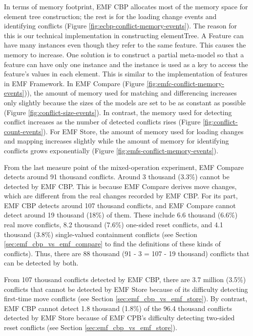 In terms of memory footprint, EMF CBP allocates most of the memory space for element tree construction; the rest is for the loading change events and identifying conflicts (Figure \ref{fig:ecbp-conflict-memory-events}). The reason for this is our technical implementation in constructing \textsf{elementTree}. A Feature can have many instances even though they refer to the same feature. This causes the memory to increase. One solution is to construct a partial meta-model so that a feature can have only one instance and the instance is used as a key to access the feature’s values in each element. This is similar to the implementation of features in EMF Framework. In EMF Compare (Figure \ref{fig:emfc-conflict-memory-events})), the amount of memory used for matching and differencing increases only slightly because the sizes of the models are set to be as constant as possible (Figure \ref{fig:conflict-size-events}). In contrast, the memory used for detecting conflict increases as the number of detected conflicts rises (Figure \ref{fig:conflict-count-events}). For EMF Store, the amount of memory used for loading changes and mapping increases slightly while the amount of memory for identifying conflicts grows exponentially (Figure \ref{fig:emfs-conflict-memory-events}).

From the last measure point of the mixed-operation experiment, EMF Compare detects around 91 thousand conflicts. Around 3 thousand (3.3\%) cannot be detected by EMF CBP. This is because EMF Compare derives move changes, which are different from the real changes recorded by EMF CBP. For its part, EMF CBP detects around 107 thousand conflicts, and EMF Compare cannot detect around 19 thousand (18\%) of them. These include 6.6 thousand (6.6\%) real move conflicts, 8.2 thousand (7.6\%) one-sided reset conflicts, and 4.1 thousand (3.8\%) single-valued containment conflicts (see Section \ref{sec:emf_cbp_vs_emf_compare} to find the definitions of these kinds of conflicts). Thus, there are 88 thousand (91 - 3 = 107 - 19 thousand) conflicts that can be detected by both.

From 107 thousand conflicts detected by EMF CBP, there are 3.7 million (3.5\%) conflicts that cannot be detected by EMF Store because of its difficulty detecting first-time move conflicts (see Section \ref{sec:emf_cbp_vs_emf_store}). By contrast, EMF CBP cannot detect 1.8 thousand (1.8\%) of the 96.4 thousand conflicts detected by EMF Store because of EMF CPB’s difficulty detecting two-sided reset conflicts (see Section \ref{sec:emf_cbp_vs_emf_store}).

